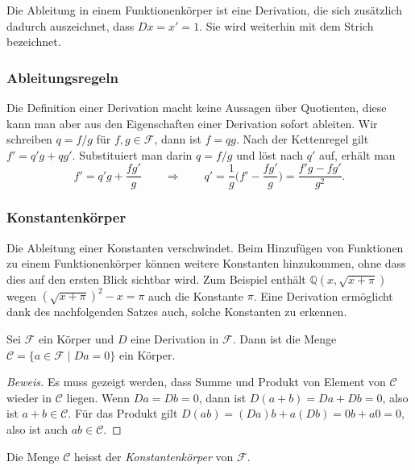Die Ableitung in einem Funktionenkörper ist eine Derivation,
die sich zusätzlich dadurch auszeichnet, dass $Dx=x'=1$.
Sie wird weiterhin mit dem Strich bezeichnet.

%
%
\subsubsection{Ableitungsregeln}
Die Definition einer Derivation macht keine Aussagen über Quotienten,
diese kann man aber aus den Eigenschaften einer Derivation sofort
ableiten.
Wir schreiben $q=f/g$ für $f,g\in\mathscr{F}$, dann ist $f=qg$.
Nach der Kettenregel gilt
\(
f'=q'g+qg'
\).
Substituiert man darin $q=f/g$ und löst nach $q'$ auf, erhält man
\[
f'=q'g+\frac{fg'}{g}
\qquad\Rightarrow\qquad
q'=\frac1{g}\biggl(f'-\frac{fg'}{g}\biggr)
=
\frac{f'g-fg'}{g^2}.
\]


%
%
\subsubsection{Konstantenkörper}
Die Ableitung einer Konstanten verschwindet.
Beim Hinzufügen von Funktionen zu einem Funktionenkörper können weitere
Konstanten hinzukommen, ohne dass dies auf den ersten Blick sichtbar wird.
Zum Beispiel enthält $\mathbb{Q}(x,\!\sqrt{x+\pi})$ wegen
$(\!\sqrt{x+\pi})^2-x=\pi$ auch die Konstante $\pi$.
Eine Derivation ermöglicht dank des nachfolgenden Satzes auch,
solche Konstanten zu erkennen.

\begin{satz}
Sei $\mathscr{F}$ ein Körper und $D$ eine Derivation in $\mathscr{F}$.
Dann ist die Menge $\mathscr{C}=\{a\in\mathscr{F}\;|\;Da=0\}$ ein Körper.
\end{satz}

\begin{proof}[Beweis]
Es muss gezeigt werden, dass Summe und Produkt von Element von $\mathscr{C}$ 
wieder in $\mathscr{C}$ liegen.
Wenn $Da=Db=0$, dann ist $D(a+b)=Da+Db=0$, also ist $a+b\in \mathscr{C}$.
Für das Produkt gilt $D(ab)=(Da)b+a(Db)=0b+a0=0$, also ist auch
$ab\in \mathscr{C}$.
\end{proof}

Die Menge $\mathscr{C}$ heisst der {\em Konstantenkörper} von $\mathscr{F}$.
%

%
%

